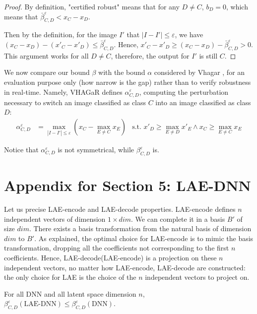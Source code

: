 \begin{proof}[Proof] By definition, "certified robust" means that for any $D\neq C$, $b_D = 0$, which means that $\bar{\beta}^{\varepsilon}_{C,D} < x_C - x_D$. 

Then by the definition, for the image $I'$ that $|I - I'|\leq \varepsilon$, we have $(x_C-x_D) - (x'_C-x'_D)\leq \bar{\beta}^{\varepsilon}_{C,D}$. Hence, $x'_C-x'_D\geq (x_C-x_D)-\bar{\beta}^{\varepsilon}_{C,D}> 0$. This argument works for all $D\neq C$, therefore, the output for $I'$ is still $C$.
\end{proof}

We now compare our bound $\beta$ with the bound $\alpha$ considered by Vhagar \cite{vhagar}, for an evaluation purpose only (how narrow is the gap) rather than to verify robustness in real-time. 
Namely, VHAGaR \cite{vhagar} defines $\alpha^{\varepsilon}_{C,D}$, computing the perturbation necessary to switch an image classified as class $C$ into an image classified as class $D$:
\begin{align*}
	\alpha^{\varepsilon}_{C,D} &= \max_{|I-I'| \leq \varepsilon} (x_C-\max_{E\neq C}x_E) &\text{s.t. }  x'_D \geq \max_{E\neq D}x'_E \wedge x_C \geq \max_{E\neq C}x_E 
\end{align*}

Notice that  
$\alpha^{\varepsilon}_{C,D}$ is not symmetrical, while 
$\beta^{\varepsilon}_{C,D}$ is.





\section{Appendix for Section 5: LAE-DNN}



Let us precise LAE-encode and LAE-decode properties.
LAE-encode defines $n$ independent vectors of dimension $1\times dim$.
We can complete it in a basis $B'$ of size $dim$.
There exists a basis transformation from the natural basis of dimension $dim$ 
to $B'$. As explained, the optimal choice for LAE-encode is to mimic the basis transformation, dropping all the coefficients not corresponding to the first $n$ coefficients. Hence, LAE-decode(LAE-encode) is a projection on these $n$ independent vectors, no matter how LAE-encode, LAE-decode are constructed: the only choice for LAE is the choice of the $n$ independent vectors to project on.

\begin{proposition}
	\label{Prop3}
	For all DNN and all latent space dimension $n$, $\beta^\varepsilon_{C,D}(\text{LAE-DNN}) \leq \beta^{\varepsilon}_{C,D}(\text{DNN})$.
\end{proposition}

